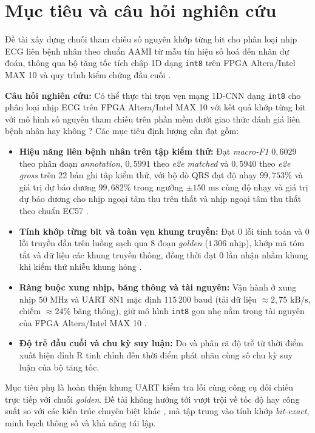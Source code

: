 \section{Mục tiêu và câu hỏi nghiên cứu}\label{sec:mucTieu}

Đề tài xây dựng chuỗi tham chiếu số nguyên khớp từng bit cho phân loại nhịp ECG liên bệnh nhân theo chuẩn AAMI từ mẫu tín hiệu số hoá đến nhãn dự đoán, thông qua bộ tăng tốc tích chập 1D dạng \texttt{int8} trên FPGA Altera/Intel MAX 10 và quy trình kiểm chứng đầu cuối \cite{moody2001impact, dechazal2004automatic, aami2012ec57, jacob2018quantization, liu2025fpga1dcnn}.

\textbf{Câu hỏi nghiên cứu:} Có thể thực thi trọn vẹn mạng 1D-CNN dạng \texttt{int8} cho phân loại nhịp ECG trên FPGA Altera/Intel MAX 10 với kết quả khớp từng bit với mô hình số nguyên tham chiếu trên phần mềm dưới giao thức đánh giá liên bệnh nhân hay không \cite{dechazal2004automatic, jacob2018quantization, liu2025fpga1dcnn}? Các mục tiêu định lượng cần đạt gồm:

\begin{itemize}
	\item \textbf{Hiệu năng liên bệnh nhân trên tập kiểm thử:} Đạt \emph{macro-F1} $0{,}6029$ theo phân đoạn \emph{annotation}, $0{,}5991$ theo \emph{e2e matched} và $0{,}5940$ theo \emph{e2e gross} trên 22 bản ghi tập kiểm thử, với bộ dò QRS đạt độ nhạy $99{,}753\%$ và giá trị dự báo dương $99{,}682\%$ trong ngưỡng $\pm 150\text{ ms}$ cùng độ nhạy và giá trị dự báo dương cho nhịp ngoại tâm thu trên thất và nhịp ngoại tâm thu thất theo chuẩn EC57 \cite{aami2012ec57, dechazal2004automatic, li2026lightweight}.
	\item \textbf{Tính khớp từng bit và toàn vẹn khung truyền:} Đạt $0$ lỗi tính toán và $0$ lỗi truyền dẫn trên luồng sạch qua 8 đoạn \emph{golden} ($1\,306$ nhịp), khớp mã tóm tắt và dữ liệu các khung truyền thông, đồng thời đạt $0$ lần nhận nhầm khung khi kiểm thử nhiễu khung hỏng \cite{jacob2018quantization}.
	\item \textbf{Ràng buộc xung nhịp, băng thông và tài nguyên:} Vận hành ở xung nhịp $50\text{ MHz}$ và UART $8\text{N1}$ mặc định $115\,200\text{ baud}$ (tải dữ liệu $\approx 2{,}75\text{ kB/s}$, chiếm $\approx 24\%$ băng thông), giữ mô hình \texttt{int8} gọn nhẹ nằm trong tài nguyên của FPGA Altera/Intel MAX 10 \cite{hariri2026hardware, liu2025fpga1dcnn}.
	\item \textbf{Độ trễ đầu cuối và chu kỳ suy luận:} Đo và phân rã độ trễ từ thời điểm xuất hiện đỉnh R tinh chỉnh đến thời điểm phát nhãn cùng số chu kỳ suy luận của bộ tăng tốc.
\end{itemize}

Mục tiêu phụ là hoàn thiện khung UART kiểm tra lỗi cùng công cụ đối chiếu trực tiếp với chuỗi \emph{golden}. Đề tài không hướng tới vượt trội về tốc độ hay công suất so với các kiến trúc chuyên biệt khác \cite{hariri2026hardware, liu2023fully}, mà tập trung vào tính khớp \emph{bit-exact}, minh bạch thông số và khả năng tái lập.
